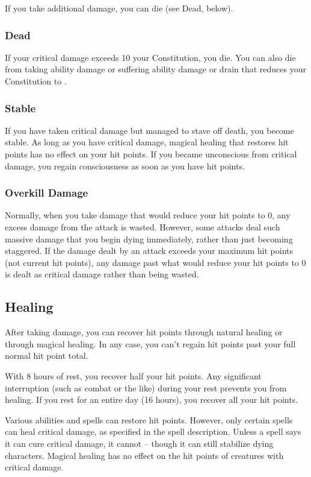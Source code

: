 If you take additional damage, you can die (see Dead, below).

\subsubsection{Dead}
If your critical damage exceeds 10 \add your Constitution, you die. You can also die from taking ability damage or suffering ability damage or drain that reduces your Constitution to .

\subsubsection{Stable}\label{Stable}
If you have taken critical damage but managed to stave off death, you become stable. As long as you have critical damage, magical healing that restores hit points has no effect on your hit points. If you became unconscious from critical damage, you regain consciousness as soon as you have hit points.

\subsubsection{Overkill Damage}
Normally, when you take damage that would reduce your hit points to 0, any excess damage from the attack is wasted. However, some attacks deal such massive damage that you begin dying immediately, rather than just becoming staggered. If the damage dealt by an attack exceeds your maximum hit points (not current hit points), any damage past what would reduce your hit points to 0 is dealt as critical damage rather than being wasted.

\subsection{Healing}
After taking damage, you can recover hit points through natural healing or through magical healing. In any case, you can't regain hit points past your full normal hit point total.

 With 8 hours of rest, you recover half your hit points. Any significant interruption (such as combat or the like) during your rest prevents you from healing. If you rest for an entire day (16 hours), you recover all your hit points.

 Various abilities and spells can restore hit points. However, only certain spells can heal critical damage, as specified in the spell description. Unless a spell says it can cure critical damage, it cannot -- though it can still stabilize dying characters. Magical healing has no effect on the hit points of creatures with critical damage.

